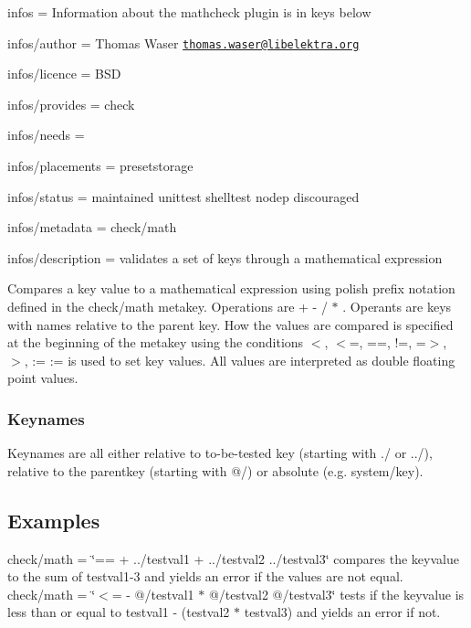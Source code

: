 
\begin{DoxyItemize}
\item infos = Information about the mathcheck plugin is in keys below
\item infos/author = Thomas Waser \href{mailto:thomas.waser@libelektra.org}{\tt thomas.\+waser@libelektra.\+org}
\item infos/licence = B\+SD
\item infos/provides = check
\item infos/needs =
\item infos/placements = presetstorage
\item infos/status = maintained unittest shelltest nodep discouraged
\item infos/metadata = check/math
\item infos/description = validates a set of keys through a mathematical expression
\end{DoxyItemize}

Compares a key value to a mathematical expression using polish prefix notation defined in the {\ttfamily check/math} metakey. Operations are {\ttfamily + -\/ / $\ast$} . Operants are keys with names relative to the parent key. How the values are compared is specified at the beginning of the metakey using the conditions {\ttfamily $<$, $<$=, ==, !=, =$>$, $>$, \+:=} {\ttfamily \+:=} is used to set key values. All values are interpreted as {\ttfamily double} floating point values.

\subsubsection*{Keynames}

Keynames are all either relative to to-\/be-\/tested key (starting with {\ttfamily ./} or {\ttfamily ../}), relative to the parentkey (starting with {\ttfamily @/}) or absolute (e.\+g. {\ttfamily system/key}).

\subsection*{Examples}

{\ttfamily check/math = \char`\"{}== + ../testval1 + ../testval2 ../testval3\char`\"{}} compares the keyvalue to the sum of testval1-\/3 and yields an error if the values are not equal. {\ttfamily check/math = \char`\"{}$<$= -\/ @/testval1 $\ast$ @/testval2 @/testval3\char`\"{}} tests if the keyvalue is less than or equal to testval1 -\/ (testval2 $\ast$ testval3) and yields an error if not.

